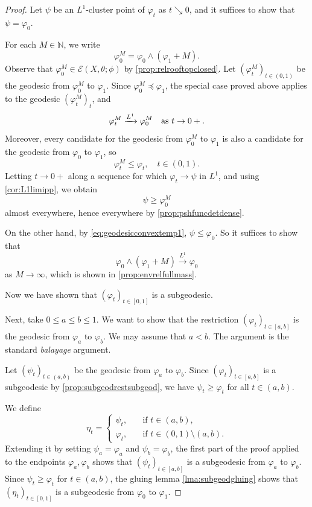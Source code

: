 \begin{proof}
    Let $\psi$ be an $L^1$-cluster point of $\varphi_t$ as $t\searrow 0$, and it suffices to show that $\psi=\varphi_0$.

    For each $M\in \mathbb{N}$, we write
    \[
        \varphi_0^M=\varphi_0\land (\varphi_1+M).
    \]
    Observe that $\varphi_0^M\in \mathcal{E}(X,\theta;\phi)$ by \cref{prop:relrooftopclosed}.
    Let $(\varphi_t^M)_{t\in (0,1)}$ be the geodesic from $\varphi_0^M$ to $\varphi_1$. Since $\varphi_0^M\preceq\varphi_1$, the special case proved above applies to the geodesic $(\varphi_t^M)_t$, and
    \[
        \varphi_t^M\xrightarrow{L^1}\varphi_0^M \quad\textup{as }t\to0+.
    \]
    Moreover, every candidate for the geodesic from $\varphi_0^M$ to $\varphi_1$ is also a candidate for the geodesic from $\varphi_0$ to $\varphi_1$, so
    \[
        \varphi_t^M\leq\varphi_t,\quad t\in(0,1).
    \]
    Letting $t\to 0+$ along a sequence for which $\varphi_t\to\psi$ in $L^1$, and using \cref{cor:L1limipp}, we obtain
    \[
        \psi\geq\varphi_0^M
    \]
    almost everywhere, hence everywhere by \cref{prop:pshfuncdetdense}.

    On the other hand, by \eqref{eq:geodesicconvextemp1}, $\psi\leq \varphi_0$. So it suffices to show that
    \[
        \varphi_0\land (\varphi_1+M)\xrightarrow{L^1}   \varphi_0
    \]
    as $M\to \infty$, which is shown in \cref{prop:envrelfullmass}.

    Now we have shown that $(\varphi_t)_{t\in [0,1]}$ is a subgeodesic.

    Next, take $0\leq a\leq b\leq 1$. We want to show that the restriction $(\varphi_t)_{t\in [a,b]}$ is the geodesic from $\varphi_a$ to $\varphi_b$. We may assume that $a<b$. The argument is the standard \emph{balayage} argument.

    Let $(\psi_t)_{t\in (a,b)}$ be the geodesic from $\varphi_a$ to $\varphi_b$. Since $(\varphi_t)_{t\in [a,b]}$ is a subgeodesic by \cref{prop:subgeodrestsubgeod}, we have $\psi_t\geq \varphi_t$ for all $t\in (a,b)$.

    We define
    \[
    \eta_t=
    \left\{
    \begin{aligned}
        \psi_t,&\quad\text{if }t\in (a,b),\\
        \varphi_t,&\quad\text{if }t\in (0,1)\setminus (a,b).
    \end{aligned}
    \right.
    \]
    Extending it by setting $\psi_a=\varphi_a$ and $\psi_b=\varphi_b$, the first part of the proof applied to the endpoints $\varphi_a,\varphi_b$ shows that $(\psi_t)_{t\in [a,b]}$ is a subgeodesic from $\varphi_a$ to $\varphi_b$. Since $\psi_t\geq \varphi_t$ for $t\in (a,b)$, the gluing lemma \cref{lma:subgeodgluing} shows that $(\eta_t)_{t\in [0,1]}$ is a subgeodesic from $\varphi_0$ to $\varphi_1$.


\end{proof}
